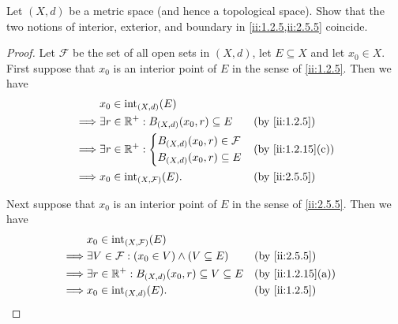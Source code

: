\begin{ex}\label{ii:ex:2.5.3}
  Let \((X, d)\) be a metric space (and hence a topological space).
  Show that the two notions of interior, exterior, and boundary in \cref{ii:1.2.5,ii:2.5.5} coincide.
\end{ex}

\begin{proof}
  Let \(\mathcal{F}\) be the set of all open sets in \((X, d)\), let \(E \subseteq X\) and let \(x_0 \in X\).
  First suppose that \(x_0\) is an interior point of \(E\) in the sense of \cref{ii:1.2.5}.
  Then we have
  \begin{align*}
             & x_0 \in \text{int}_{(X, d)}(E)                                         \\
    \implies & \exists r \in \R^+ : B_{(X, d)}(x_0, r) \subseteq E &  & \by{ii:1.2.5} \\
    \implies & \exists r \in \R^+ : \begin{dcases}
                                      B_{(X, d)}(x_0, r) \in \mathcal{F} \\
                                      B_{(X, d)}(x_0, r) \subseteq E
                                    \end{dcases}               &  & \by{ii:1.2.15}[c] \\
    \implies & x_0 \in \text{int}_{(X, \mathcal{F})}(E).           &  & \by{ii:2.5.5}
  \end{align*}

  Next suppose that \(x_0\) is an interior point of \(E\) in the sense of \cref{ii:2.5.5}.
  Then we have
  \begin{align*}
             & x_0 \in \text{int}_{(X, \mathcal{F})}(E)                                               \\
    \implies & \exists V \in \mathcal{F} : (x_0 \in V) \land (V \subseteq E)   &  & \by{ii:2.5.5}     \\
    \implies & \exists r \in \R^+ : B_{(X, d)}(x_0, r) \subseteq V \subseteq E &  & \by{ii:1.2.15}[a] \\
    \implies & x_0 \in \text{int}_{(X, d)}(E).                                 &  & \by{ii:1.2.5}
  \end{align*}


\end{proof}
